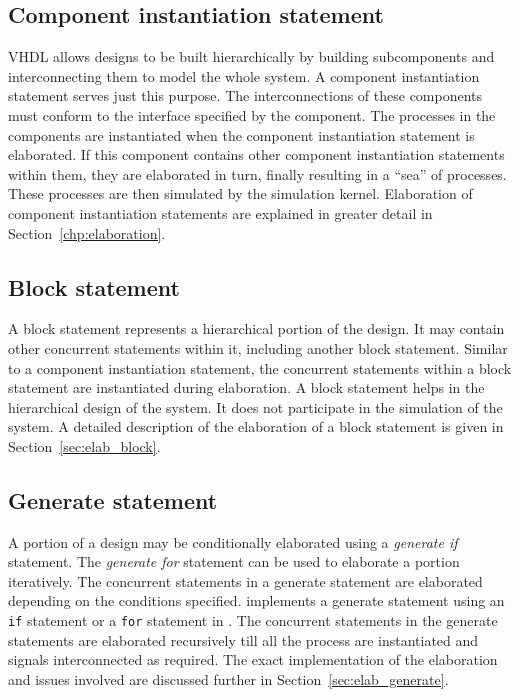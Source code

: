 \documentclass[11pt]{article}
\begin{document}
\subsection{Component instantiation statement}

VHDL allows designs to be built hierarchically by building subcomponents
and interconnecting them to model the whole system.  A component
instantiation statement serves just this purpose.  The interconnections of
these components must conform to the interface specified by the component.
The processes in the components are instantiated when the component
instantiation statement is elaborated.  If this component contains other
component instantiation statements within them, they are elaborated in
turn, finally resulting in a ``sea'' of processes.  These processes are
then simulated by the \tyvis\/ simulation kernel.  Elaboration of component
instantiation statements are explained in greater detail in
Section~\ref{chp:elaboration}.

\subsection{Block statement}

A block statement represents a hierarchical portion of the design.  It
may contain other concurrent statements within it, including another
block statement.  Similar to a component instantiation statement, the
concurrent statements within a block statement are instantiated during
elaboration.  A block statement helps in the hierarchical design of
the system.  It does not participate in the simulation of the
system. A detailed description of the elaboration of a block statement
is given in Section~\ref{sec:elab_block}.

\subsection{Generate statement}

A portion of a design may be conditionally elaborated using a
\textit{generate if} statement.  The \textit{generate for} statement can be
used to elaborate a portion iteratively.  The concurrent statements in a
generate statement are elaborated depending on the conditions specified.
\tyvis\/ implements a generate statement using an \texttt{if} statement or
a \texttt{for} statement in \Cpp\/.  The concurrent statements in the
generate statements are elaborated recursively till all the process are
instantiated and signals interconnected as required.  The exact
implementation of the elaboration and issues involved are discussed
further in Section~\ref{sec:elab_generate}.
\end{document}
